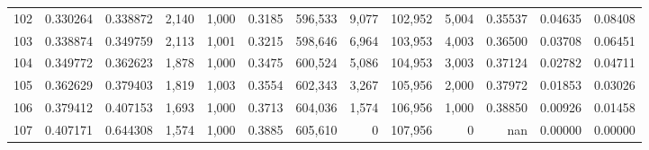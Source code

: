 \begin{tabular}{rrrrrrrrrrrrr}
102 &  0.330264 &  0.338872 &   2,140 &  1,000 &                                     0.3185 &  596,533 &    9,077 &  102,952 &    5,004 &  0.35537 &  0.04635 &  0.08408 \\
103 &  0.338874 &  0.349759 &   2,113 &  1,001 &                                     0.3215 &  598,646 &    6,964 &  103,953 &    4,003 &  0.36500 &  0.03708 &  0.06451 \\
104 &  0.349772 &  0.362623 &   1,878 &  1,000 &                                     0.3475 &  600,524 &    5,086 &  104,953 &    3,003 &  0.37124 &  0.02782 &  0.04711 \\
105 &  0.362629 &  0.379403 &   1,819 &  1,003 &                                     0.3554 &  602,343 &    3,267 &  105,956 &    2,000 &  0.37972 &  0.01853 &  0.03026 \\
106 &  0.379412 &  0.407153 &   1,693 &  1,000 &                                     0.3713 &  604,036 &    1,574 &  106,956 &    1,000 &  0.38850 &  0.00926 &  0.01458 \\
107 &  0.407171 &  0.644308 &   1,574 &  1,000 &                                     0.3885 &  605,610 &        0 &  107,956 &        0 &      nan &  0.00000 &  0.00000 \\
\bottomrule
\end{tabular}
